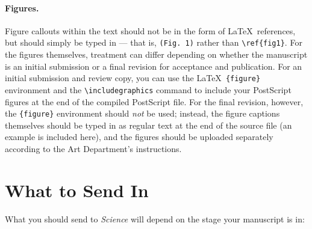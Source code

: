\documentclass[12pt]{article}
\begin{document}
\paragraph*{Figures.}  Figure callouts within the text should not be
in the form of \LaTeX\ references, but should simply be typed in ---
that is, \verb+(Fig. 1)+ rather than \verb+\ref{fig1}+.  For the
figures themselves, treatment can differ depending on whether the
manuscript is an initial submission or a final revision for acceptance
and publication.  For an initial submission and review copy, you can
use the \LaTeX\ \verb+{figure}+ environment and the
\verb+\includegraphics+ command to include your PostScript figures at
the end of the compiled PostScript file.  For the final revision,
however, the \verb+{figure}+ environment should {\it not\/} be used;
instead, the figure captions themselves should be typed in as regular
text at the end of the source file (an example is included here), and
the figures should be uploaded separately according to the Art
Department's instructions.


\section*{What to Send In}

What you should send to {\it Science\/} will depend on the stage your manuscript is in:
\end{document}
